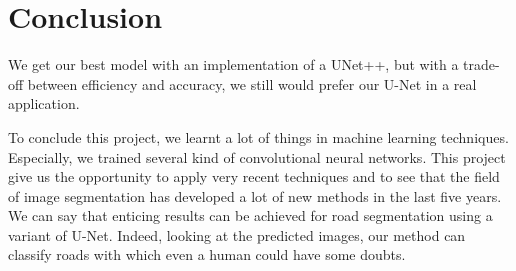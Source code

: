 \documentclass[10pt,conference,a4paper]{IEEEtran}
\begin{document}
\section{Conclusion}

We get our best model with an implementation of a UNet++, but with a trade-off between efficiency and accuracy, we still would prefer our U-Net in a real application.  

To conclude this project, we learnt a lot of things in machine learning techniques. 
Especially, we trained several kind of convolutional neural networks.
This project give us the opportunity to apply very recent techniques and to see that the field of image segmentation has developed a lot of new methods in the last five years.
We can say that enticing results can be achieved for road segmentation using a variant of U-Net.
Indeed, looking at the predicted images, our method can classify roads with which even a human could have some doubts.

\newpage



\end{document}
